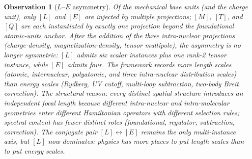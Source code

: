 \documentclass[11pt]{article}
\newtheorem{observation}{Observation}
\begin{document}
\begin{observation}[$L$--$E$ asymmetry]
\label{obs:LE_asymmetry}
Of the mechanical base units (and the charge unit), only $[L]$ and
$[E]$ are injected by multiple projections; $[M]$, $[T]$, and $[Q]$
are each instantiated by exactly one projection beyond the
foundational atomic-units anchor.  After the addition of the three
intra-nuclear projections (charge-density, magnetization-density,
tensor multipole), the asymmetry is no longer symmetric: $[L]$
admits \emph{six} scalar instances plus one rank-2 tensor instance,
while $[E]$ admits four.  The framework records more length scales
(atomic, internuclear, polyatomic, and three intra-nuclear
distribution scales) than energy scales (Rydberg, UV cutoff,
multi-loop subtraction, two-body Breit correction).  The structural
reason: every distinct spatial structure introduces an independent
focal length because different intra-nuclear and intra-molecular
geometries enter different Hamiltonian operators with different
selection rules; spectral content has fewer distinct roles
(foundational, regulator, subtraction, correction).  The conjugate
pair $[L] \leftrightarrow [E]$ remains the only multi-instance
axis, but $[L]$ now dominates: physics has more places to put
length scales than to put energy scales.
\end{observation}
\end{document}
